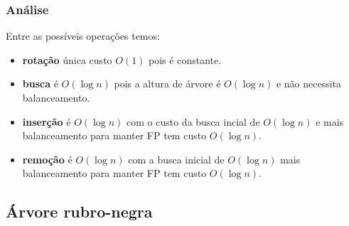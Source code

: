 \subsubsection{Análise}

Entre as possíveis operações temos:
\begin{itemize}
\item {\bf rotação} única custo $O(1)$ pois é constante.
\item {\bf busca}  é $O(\log n)$ pois a altura de árvore é $O(\log n)$
e não necessita balanceamento.
\item {\bf inserção} é $O(\log n)$ com o custo da busca incial de $O(\log n)$
e mais balanceamento para manter FP tem custo $O(\log n)$.
\item {\bf remoção} é $O(\log n)$ com a busca inicial de $O(\log n)$ mais
balanceamento para manter FP tem custo $O(\log n)$.
\end{itemize}

\subsection{Árvore rubro-negra}

